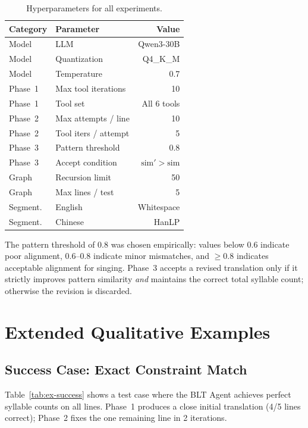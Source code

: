 \documentclass[11pt]{article}
\begin{document}
\begin{table}[h]
\centering
\small
\begin{tabular}{@{}llr@{}}
\toprule
\textbf{Category} & \textbf{Parameter} & \textbf{Value} \\
\midrule
Model & LLM & Qwen3-30B \\
Model & Quantization & Q4\_K\_M \\
Model & Temperature & 0.7 \\
\midrule
Phase~1 & Max tool iterations & 10 \\
Phase~1 & Tool set & All 6 tools \\
\midrule
Phase~2 & Max attempts / line & 10 \\
Phase~2 & Tool iters / attempt & 5 \\
\midrule
Phase~3 & Pattern threshold & 0.8 \\
Phase~3 & Accept condition & $\text{sim}' > \text{sim}$ \\
\midrule
Graph & Recursion limit & 50 \\
Graph & Max lines / test & 5 \\
\midrule
Segment. & English & Whitespace \\
Segment. & Chinese & HanLP \\
\bottomrule
\end{tabular}
\caption{Hyperparameters for all experiments.}
\label{tab:hyperparams}
\end{table}

The pattern threshold of 0.8 was chosen empirically: values below 0.6 indicate poor alignment, 0.6--0.8 indicate minor mismatches, and $\geq$0.8 indicates acceptable alignment for singing.
Phase~3 accepts a revised translation only if it strictly improves pattern similarity \emph{and} maintains the correct total syllable count; otherwise the revision is discarded.


\section{Extended Qualitative Examples}
\label{app:examples}

\subsection{Success Case: Exact Constraint Match}

Table~\ref{tab:ex-success} shows a test case where the BLT Agent achieves perfect syllable counts on all lines.
Phase~1 produces a close initial translation (4/5 lines correct); Phase~2 fixes the one remaining line in 2 iterations.
\end{document}
